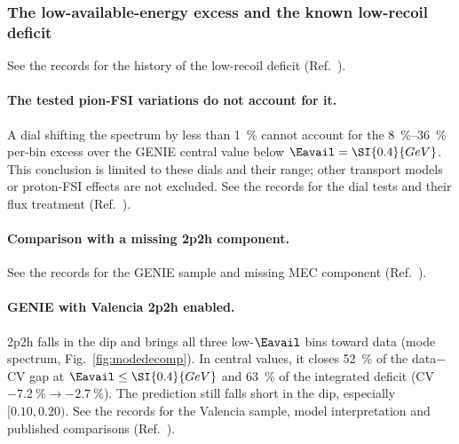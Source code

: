 \subsubsection{The low-available-energy excess and the known low-recoil deficit}
\label{sec:3d-2p2h}
See the records for the history of the low-recoil deficit (Ref.~\cite{NoteRecords2026}).

\paragraph{The tested pion-FSI variations do not account for it.} A dial shifting the spectrum by less than \SI{1}{\percent} cannot account for the \SIrange{8}{36}{\percent} per-bin excess over the GENIE central value below $\Eavail=\SI{0.4}{GeV}$. This conclusion is limited to these dials and their range; other transport models or proton-FSI effects are not excluded. See the records for the dial tests and their flux treatment (Ref.~\cite{NoteRecords2026}).

\paragraph{Comparison with a missing 2p2h component.} See the records for the GENIE sample and missing MEC component (Ref.~\cite{NoteRecords2026}).

\paragraph{GENIE with Valencia 2p2h enabled.} 2p2h falls in the dip and brings all three low-$\Eavail$ bins toward data (mode spectrum, Fig.~\ref{fig:modedecomp}). In central values, it closes \SI{52}{\percent} of the data$-$CV gap at $\Eavail\le\SI{0.4}{GeV}$ and \SI{63}{\percent} of the integrated deficit (CV $-\SI{7.2}{\percent}\to-\SI{2.7}{\percent}$). The prediction still falls short in the dip, especially $[0.10,0.20)$. See the records for the Valencia sample, model interpretation and published comparisons (Ref.~\cite{NoteRecords2026}).

